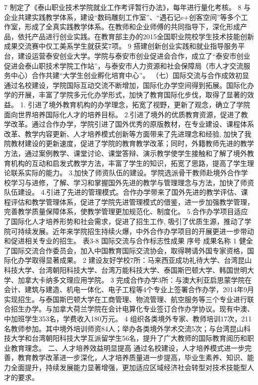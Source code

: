 7
制定了《泰山职业技术学院就业工作考评暂行办法》，每年进行量化考核。
8
与企业共建实践教学体系，建设“数码雕刻工作室”、“遇石记e+创客空间”等多个工作室，形成了全真实践教学体系。在教师和企业师傅的共同指导下，深化形成产品，依托产品进行创业实践。在教育部主办的2015全国职业院校学生技术技能创新成果交流赛中仅工美系学生就获奖7项。
9
搭建创新创业实践和就业指导服务平台，建设运营泰安创业大学。学院与泰安市创业促进会合作，成立了“泰安市创业促进会泰山职技术学院工作站”，与泰安市人力资源和社会保障局（市人才交流服务中心）合作共建“大学生创业孵化培育中心”。
（七）国际交流与合作成效初显
通过名校建设，学院国际互动交流不断增加，国际化办学空间得到拓展。国际化办学的开展，丰富了学院多元化办学形式，加快了教育国际化步伐，取得了显著的效益。
1. 引进了境外教育机构的办学理念，拓宽了视野，更新了观念，确立了学院面向世界培养国际化人才的培养目标。
2.引进了境外的优质教育资源，促进了教学改革。通过合作办学，学院引进了国外优秀的原版教材，在专业建设、课程体系改革、教学内容更新、人才培养模式创新等方面带来了先进理念和经验, 加快了我院教材建设的更新速度，促进了学院的教育教学改革；同时，外籍教师先进的教学方法，通过案例教学、课堂讨论、课堂答辩、演示教学使学生接触和了解了境外教育机构的互动和启发式教学方法，丰富了学生的知识，拓宽了思路，提高了学生理论联系实际的能力。
3.加快了师资队伍的建设。学院选派骨干教师赴境外合作学校学习与进修，了解、学习和掌握国外先进的教学与管理理念与方法，加快了师资队伍建设。
4.引进了先进的管理模式。合作办学带来了国外先进的教学评估、课程评估和教学管理体系，促进了学院先进管理模式的借鉴，进一步加强教学管理，完善教学质量保障体系，使教学管理更加规范化、制度化。
5.合作办学项目适应了国际化人才培养形势和社会需求，促进了招生工作, 吸引了优质生源，推动了学院可持续发展。近年来学院招生持续火爆，中外合作办学项目的开展更进一步带动和促进相关专业的招生。
表3-8  国际交流与合作标志性成果
序号
成果名称
1
健全了国际交流合作委员会，加入中国教育国际交流协会，取得聘请外国专家资格，国际化办学取得显著成果。
2
建设友好学校7所：马来西亚成功礼待大学、台湾昆山科技大学、台湾朝阳科技大学、台湾万能科技大学、泰国斯巴顿大学、韩国世明大学、加拿大卡纳多文理应用学院。
3
完成合作办学3所：与澳大利亚启思蒙学院在会计、建筑与建造、机电一体化、电子工程等4个专业上签署合作办学，2014年9月实现招生。与泰国斯巴顿大学在工商管理、物流管理、航空服务等三个专业进行联合招生办学。与加拿大荷兰学院在会计电算化专业签订合作办学协议。现有中澳、中加班学生353名，学费收入180万元。
4
组织各类境外专家、教师培训17次，211名教师参加。其中境外培训师资84人；举办各类境外学术交流5次；与台湾昆山科技大学和台湾朝阳科技大学互派留学生56名，提升了广大教师的国际教育阅历和职业教育理念。
二、人才培养效益明显提高
通过名校建设，人才培养模式进一步完善，教育教学改革进一步深化，人才培养质量进一步提高，毕业生素养、知识、能力全面提升，持续发展能力显著增强，更加适应区域经济社会转型对技术技能型人才的要求。
